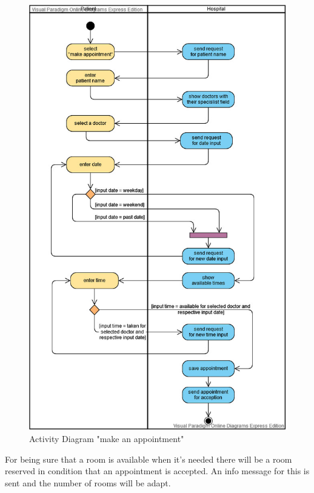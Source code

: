 \begin{figure}[H]
\centering
\sidecaption
\includegraphics[scale=.55]{images/melanie_images/MakeAppointment.jpg}
\caption{Activity Diagram "make an appointment"}
\label{Make_Appointment}
\end{figure}

For being sure that a room is available when it's needed there will be a room reserved in condition that an appointment is accepted. An info message for this is sent and the number of rooms will be adapt. %


